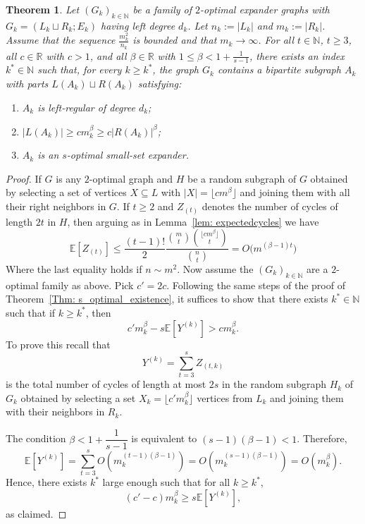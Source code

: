 \documentclass[12pt]{amsart}
\newtheorem{theorem}[lemma]{Theorem}
\theoremstyle{definition}
\renewcommand{\geq}{\geqslant}
\renewcommand{\leq}{\leqslant}
\newcommand{\NN}{\ensuremath{\mathbb{N}}}
\newcommand{\RR}{\ensuremath{\mathbb{R}}}
\newcommand{\EE}{\ensuremath{\mathbb{E}}}
\newcommand{\1}{\ensuremath{\mathbb{1}}}
\begin{document}
\begin{theorem}\label{Thm: existance_nonlinear} Let $(G_k)_{k\in\mathbb{N}}$ be a family of $2$-optimal expander graphs with
$G_k = (L_k \sqcup R_k; E_k)$ having left degree $d_k$. Let $n_k := |L_k|$ and $m_k := |R_k|$. Assume that the sequence $\frac{m_k^2}{n_k}$ is bounded and that $m_k \to \infty$. For all $t \in \mathbb{N}$, $t \ge 3$, all $c \in \mathbb{R}$ with $c > 1$, and all
$\beta \in \RR$ with $1 \leq \beta < 1 + \frac{1}{s-1}$, there exists an index
$k^\ast \in \mathbb{N}$ such that, for every $k \ge k^\ast$, the graph $G_k$
contains a bipartite subgraph $A_k$ with parts
$L(A_k) \sqcup R(A_k)$ satisfying:
\begin{enumerate}
  \item $A_k$ is left-regular of degree $d_k$;
  \item $|L(A_k)| \ge c m_k^{\beta} \ge c |R(A_k)|^{\beta}$;
  \item $A_k$ is an $s$-optimal small-set expander.
\end{enumerate}
\end{theorem}
\begin{proof} If $G$ is any $2$-optimal graph and $H$ be a random subgraph of $G$ obtained by selecting a set of vertices
$X \subseteq L$ with $|X| = \lfloor c m^{\beta} \rfloor$ and joining them with all their right neighbors in $G$.
If $t \geq 2$ and $Z_{(t)}$ denotes the number of cycles of length $2t$ in $H$, then arguing as in Lemma~\ref{lem: expectedcycles} we have
\[
\EE[Z_{(t)}] \leq \frac{(t-1)!}{2}
\frac{\binom{m}{t}\binom{\lfloor c m^{\beta} \rfloor}{t}}{\binom{n}{t}}= O\bigl(m^{(\beta-1)t}\bigr)
\]
Where the last equality holds if $n \sim m^2$.
Now assume the $(G_k)_{k\in \NN}$ are a $2$-optimal family as above. Pick $c' = 2c$. Following the same steps of the proof of Theorem~\ref{Thm: s_optimal_existence}, it suffices to show that there exists
$k^{*} \in \NN$ such that if $k \geq k^{*}$, then
\[
c' m_k^{\beta} - s \EE[Y^{(k)}] > c m_k^{\beta}.
\]
To prove this recall that
\[
Y^{(k)} = \sum_{t=3}^{s} Z_{(t,k)}
\]
is the total number of cycles of length at most $2s$ in the random subgraph $H_k$ of $G_k$ obtained by selecting
a set $X_k = \lfloor c' m_k^{\beta} \rfloor$ vertices from $L_k$ and joining them with their neighbors in $R_k$. 

The condition $\beta < 1 + \dfrac{1}{s-1}$ is equivalent to $(s-1)(\beta - 1) < 1$.
Therefore,
\[
\EE[Y^{(k)}]
= \sum_{t = 3}^{s} O\!\left(m_k^{(t-1)(\beta-1)}\right)
= O\!\left(m_k^{(s-1)(\beta-1)}\right)
= O\!\left(m_k^{\beta}\right).
\]
Hence, there exists $k^{*}$ large enough such that for all $k \geq k^{*}$,
\[
(c' - c)m_k^{\beta} \geq s \EE[Y^{(k)}],
\]
as claimed.\end{proof}
\end{document}
